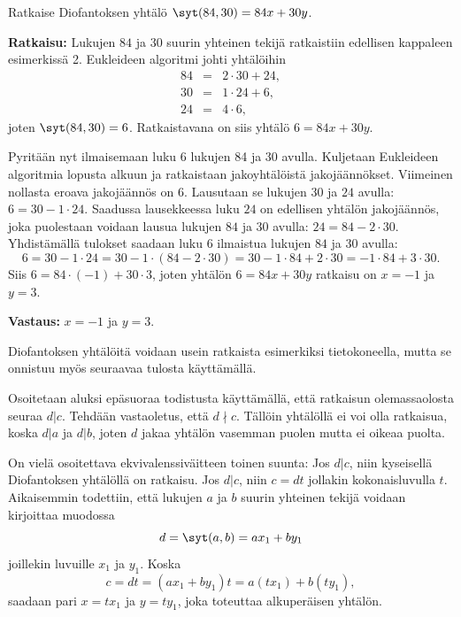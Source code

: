 \begin{esimerkki}
Ratkaise Diofantoksen yhtälö
$\syt(84,30) = 84x + 30y$.

{\bf Ratkaisu:} Lukujen $84$ ja $30$ suurin yhteinen tekijä
ratkaistiin edellisen kappaleen esimerkissä 2. Eukleideen
algoritmi johti yhtälöihin
\begin{eqnarray*}
84 &=& 2 \cdot 30 + 24,\\
30 &=& 1 \cdot 24 + 6,\\
24 &=& 4 \cdot 6,
\end{eqnarray*}
joten $\syt(84,30) = 6$. Ratkaistavana on siis yhtälö $6
= 84x + 30y$.

Pyritään nyt ilmaisemaan luku 6 lukujen 84 ja 30 avulla.
Kuljetaan Eukleideen algoritmia lopusta alkuun ja
ratkaistaan jakoyhtälöistä jakojäännökset. Viimeinen
nollasta eroava jakojäännös on $6$. Lausutaan se lukujen
$30$ ja $24$ avulla: $6 = 30 - 1 \cdot 24$. Saadussa
lausekkeessa luku $24$ on edellisen yhtälön jakojäännös,
joka puolestaan voidaan lausua lukujen $84$ ja $30$
avulla: $24 = 84 - 2 \cdot 30$. Yhdistämällä tulokset
saadaan luku $6$ ilmaistua lukujen $84$ ja $30$ avulla:
\[
6 = 30 - 1 \cdot 24 = 30 - 1 \cdot (84 - 2 \cdot 30) = 30
- 1 \cdot 84 + 2 \cdot 30 = -1 \cdot 84 + 3 \cdot 30.
\]
Siis $6 = 84 \cdot (-1) + 30 \cdot 3$, joten yhtälön $6=84x+30y$
ratkaisu on $x = -1$ ja $y = 3$.

{\bf Vastaus:} $x = -1$ ja $y = 3$.
\end{esimerkki}

Diofantoksen yhtälöitä voidaan usein ratkaista esimerkiksi tietokoneella, mutta se onnistuu myös seuraavaa tulosta käyttämällä.


\begin{todistus}

Osoitetaan aluksi epäsuoraa todistusta käyttämällä, että ratkaisun olemassaolosta seuraa $d|c$. Tehdään vastaoletus, että $d \nmid c$. Tällöin yhtälöllä ei voi olla ratkaisua, koska $d|a$ ja $d|b$, joten $d$ jakaa yhtälön vasemman puolen mutta ei oikeaa puolta.

On vielä osoitettava ekvivalenssiväitteen toinen suunta: Jos $d|c$, niin kyseisellä Diofantoksen yhtälöllä on ratkaisu. Jos $d|c$, niin $c=dt$ jollakin kokonaisluvulla $t$. Aikaisemmin todettiin, että lukujen $a$ ja $b$ suurin yhteinen tekijä voidaan kirjoittaa muodossa
\[
d=\syt(a,b)=a x_1 + b y_1
\]
joillekin luvuille $x_1$ ja $y_1$. Koska
\[
c = dt = (ax_1 + by_1)t = a(tx_1)+ b(ty_1),
\]
saadaan pari $x=tx_1$ ja $y=ty_1$, joka toteuttaa alkuperäisen yhtälön.
\end{todistus}

